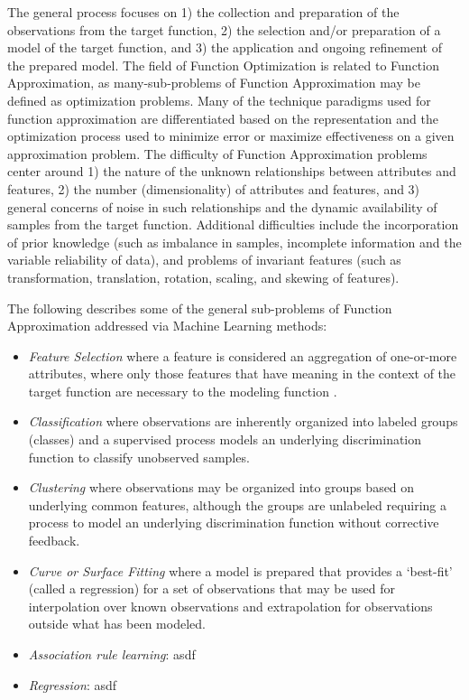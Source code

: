 \documentclass[a4paper, 11pt]{article}
\begin{document}
The general process focuses on 1) the collection and preparation of the observations from the target function, 2) the selection and/or preparation of a model of the target function, and 3) the application and ongoing refinement of the prepared model. 
The field of Function Optimization is related to Function Approximation, as many-sub-problems of Function Approximation may be defined as optimization problems. Many of the technique paradigms used for function approximation are differentiated based on the representation and the optimization process used to minimize error or maximize effectiveness on a given approximation problem. 
The difficulty of Function Approximation problems center around 1) the nature of the unknown relationships between attributes and features, 2) the number (dimensionality) of attributes and features, and 3) general concerns of noise in such relationships and the dynamic availability of samples from the target function.
Additional difficulties include the incorporation of prior knowledge (such as imbalance in samples, incomplete information and the variable reliability of data), and problems of invariant features (such as transformation, translation, rotation, scaling, and skewing of features).

The following describes some of the general sub-problems of Function Approximation addressed via Machine Learning methods:

\begin{itemize}
	\item \emph{Feature Selection} where a feature is considered an aggregation of one-or-more attributes, where only those features that have meaning in the context of the target function are necessary to the modeling function \cite{Kudo2000, Guyon2003}.
	\item \emph{Classification} where observations are inherently organized into labeled groups (classes) and a supervised process models an underlying discrimination function to classify unobserved samples.
	\item \emph{Clustering} where observations may be organized into groups based on underlying common features, although the groups are unlabeled requiring a process to model an underlying discrimination function without corrective feedback.
	\item \emph{Curve or Surface Fitting} where a model is prepared that provides a `best-fit' (called a regression) for a set of observations that may be used for interpolation over known observations and extrapolation for observations outside what has been modeled.
	
	\item \emph{Association rule learning}: asdf
	\item \emph{Regression}: asdf

	
\end{itemize}
\end{document}
